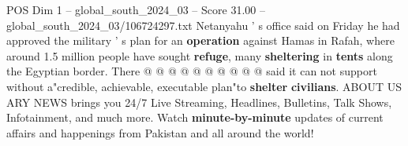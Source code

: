\begin{textsample}{POS Dim 1 – global\_south\_2024\_03 – Score 31.00 – global\_south\_2024\_03/106724297.txt}
Netanyahu ' s office said on Friday he had approved the military ' s plan for an \textbf{operation} against Hamas in Rafah, where around 1.5 million people have sought \textbf{refuge}, many \textbf{sheltering} in \textbf{tents} along the Egyptian border.
There @ @ @ @ @ @ @ @ @ @ said it can not support without a"credible, achievable, executable plan"to \textbf{shelter} \textbf{civilians}.
ABOUT US ARY NEWS brings you 24/7 Live Streaming, Headlines, Bulletins, Talk Shows, Infotainment, and much more.
Watch \textbf{minute-by-minute} updates of current affairs and happenings from Pakistan and all around the world!

\end{textsample}
